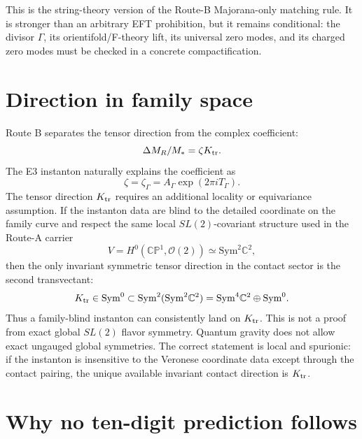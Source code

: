 \documentclass[11pt]{article}
\newcommand{\cO}{\mathcal{O}}
\begin{document}
This is the string-theory version of the Route-B Majorana-only matching rule.
It is stronger than an arbitrary EFT prohibition, but it remains conditional:
the divisor \(\Gamma\), its orientifold/F-theory lift, its universal zero
modes, and its charged zero modes must be checked in a concrete
compactification.

\section{Direction in family space}

Route B separates the tensor direction from the complex coefficient:
\begin{equation}
  \Delta M_R/M_*=\zeta K_{\rm tr}.
\end{equation}
The E3 instanton naturally explains the coefficient as
\begin{equation}
  \zeta=\zeta_\Gamma=A_\Gamma\exp(2\pi iT_\Gamma).
\end{equation}
The tensor direction \(K_{\rm tr}\) requires an additional locality or
equivariance assumption.  If the instanton data are blind to the detailed
coordinate on the family curve and respect the same local \(SL(2)\)-covariant
structure used in the Route-A carrier
\begin{equation}
  V=H^0(\mathbb{CP}^1,\cO(2))\simeq \mathrm{Sym}^2\mathbb C^2,
\end{equation}
then the only invariant symmetric tensor direction in the contact sector is
the second transvectant:
\begin{equation}
  K_{\rm tr}\in\mathrm{Sym}^0
  \subset
  \mathrm{Sym}^2(\mathrm{Sym}^2\mathbb C^2)
  =
  \mathrm{Sym}^4\mathbb C^2\oplus\mathrm{Sym}^0.
\end{equation}
Thus a family-blind instanton can consistently land on \(K_{\rm tr}\).  This
is not a proof from exact global \(SL(2)\) flavor symmetry.  Quantum gravity
does not allow exact ungauged global symmetries.  The correct statement is
local and spurionic: if the instanton is insensitive to the Veronese coordinate
data except through the contact pairing, the unique available invariant
contact direction is \(K_{\rm tr}\).

\section{Why no ten-digit prediction follows}
\end{document}
